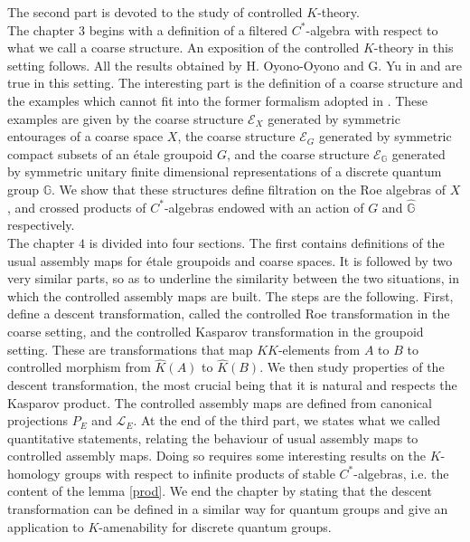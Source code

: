 The second part is devoted to the study of controlled $K$-theory. \\

The chapter $3$ begins with a definition of a filtered $C^*$-algebra with respect to what we call a coarse structure. An exposition of the controlled $K$-theory in this setting follows. All the results obtained by H. Oyono-Oyono and G. Yu in \cite{OY2} and \cite{OY3} are true in this setting. The interesting part is the definition of a coarse structure and the examples which cannot fit into the former formalism adopted in \cite{OY2}. These examples are given by the coarse structure $\mathcal E_X$ generated by symmetric entourages of a coarse space $X$, the coarse structure $\mathcal E_G$ generated by symmetric compact subsets of an étale groupoid $G$, and the coarse structure $\mathcal E_{\mathbb G}$ generated by symmetric unitary finite dimensional representations of a discrete quantum group $\mathbb G$. We show that these structures define filtration on the Roe algebras of $X$, and crossed products of $C^*$-algebras endowed with an action of $G$ and $\hat{\mathbb G}$ respectively.\\

The chapter $4$ is divided into four sections. The first contains definitions of the usual assembly maps for étale groupoids and coarse spaces. It is followed by two very similar parts, so as to underline the similarity between the two situations, in which the controlled assembly maps are built. The steps are the following. First, define a descent transformation, called the controlled Roe transformation in the coarse setting, and the controlled Kasparov transformation in the groupoid setting. These are transformations that map $KK$-elements from $A$ to $B$ to controlled morphism from $\hat K(A)$ to $\hat K(B)$. %
We then study properties of the descent transformation, the most crucial being that it is natural and respects the Kasparov product. The controlled assembly maps are defined from canonical projections $P_E$ and $\mathcal L_E$. At the end of the third part, we states what we called quantitative statements, relating the behaviour of usual assembly maps to controlled assembly maps. Doing so requires some interesting results on the $K$-homology groups with respect to infinite products of stable $C^*$-algebras, i.e. the content of the lemma \ref{prod}. We end the chapter by stating that the descent transformation can be defined in a similar way for quantum groups and give an application to $K$-amenability for discrete quantum groups.\\

